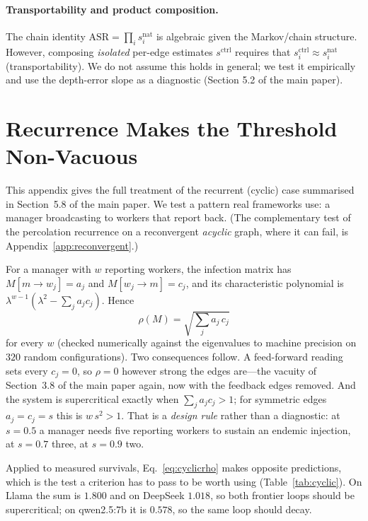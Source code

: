 \documentclass[sigconf,anonymous]{aamas}
\begin{document}
\paragraph{Transportability and product composition.} The chain identity
$\mathrm{ASR}=\prod_i s_i^{\mathrm{nat}}$ is algebraic given the Markov/chain
structure. However, composing \emph{isolated} per-edge estimates $s^{\mathrm{ctrl}}$
requires that $s^{\mathrm{ctrl}}_i \approx s^{\mathrm{nat}}_i$ (transportability). We do
not assume this holds in general; we test it empirically and use the depth-error slope
as a diagnostic (Section 5.2 of the main paper).

\section{Recurrence Makes the Threshold Non-Vacuous}
\label{app:cyclic}

This appendix gives the full treatment of the recurrent (cyclic) case summarised in
Section~5.8 of the main paper. We test a pattern real frameworks use: a manager
broadcasting to workers that report back. (The complementary test of the percolation
recurrence on a reconvergent \emph{acyclic} graph, where it can fail, is
Appendix~\ref{app:reconvergent}.)

For a manager with $w$ reporting workers, the infection matrix has
$M[m\!\to\! w_j] = a_j$ and $M[w_j\!\to\! m] = c_j$, and its characteristic
polynomial is $\lambda^{w-1}(\lambda^2 - \sum_j a_j c_j)$. Hence
\begin{equation}
  \rho(M) = \sqrt{\textstyle\sum_j a_j\,c_j}
  \label{eq:cyclicrho}
\end{equation}
for every $w$ (checked numerically against the eigenvalues to machine precision on
$320$ random configurations). Two consequences follow. A feed-forward reading sets
every $c_j = 0$, so $\rho = 0$ however strong the edges are---the vacuity of
Section~3.8 of the main paper again, now with the feedback edges removed. And the
system is supercritical exactly when $\sum_j a_j c_j > 1$; for symmetric edges
$a_j = c_j = s$ this is $w\,s^2 > 1$. That is a \emph{design rule} rather than a
diagnostic: at $s = 0.5$ a manager needs five reporting workers to sustain an
endemic injection, at $s = 0.7$ three, at $s = 0.9$ two.

Applied to measured survivals, Eq.~\eqref{eq:cyclicrho} makes opposite
predictions, which is the test a criterion has to pass to be worth using
(Table~\ref{tab:cyclic}). On Llama the sum is $1.800$ and on DeepSeek $1.018$, so both
frontier loops should be supercritical; on qwen2.5:7b it is $0.578$, so the same loop
should decay.
\end{document}
